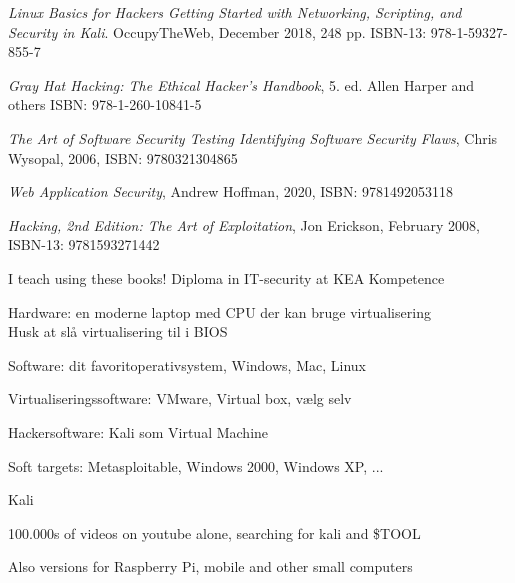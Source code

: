 \documentclass[Screen16to9,17pt]{foils}
\begin{document}


\begin{list2}
\item \emph{Linux Basics for Hackers Getting Started with Networking, Scripting, and Security in Kali}. OccupyTheWeb, December 2018, 248 pp. ISBN-13: 978-1-59327-855-7
\item \emph{Gray Hat Hacking: The Ethical Hacker's Handbook}, 5. ed. Allen Harper and others ISBN: 978-1-260-10841-5
\item \emph{The Art of Software Security Testing Identifying Software Security Flaws}, Chris Wysopal, 2006, ISBN: 9780321304865
\item \emph{Web Application Security}, Andrew Hoffman, 2020, ISBN: 9781492053118
\item \emph{Hacking, 2nd Edition: The Art of Exploitation}, Jon Erickson, February 2008, ISBN-13: 9781593271442
\end{list2}

{\footnotesize
I teach using these books! Diploma in IT-security at KEA Kompetence\\
 }




\begin{list2}
\item Hardware: en moderne laptop med CPU der kan bruge virtualisering\\
 Husk at slå virtualisering til i BIOS
\item Software: dit favoritoperativsystem, Windows, Mac, Linux
\item Virtualiseringssoftware: VMware, Virtual box, vælg selv
\item Hackersoftware: Kali som Virtual Machine 
\item Soft targets: Metasploitable, Windows 2000, Windows XP, ...
\end{list2}




\begin{list1}
\item  Kali 
\item 100.000s of videos on youtube alone, searching for kali and \$TOOL
\item Also versions for Raspberry Pi, mobile and other small computers
\end{list1}
\end{document}

